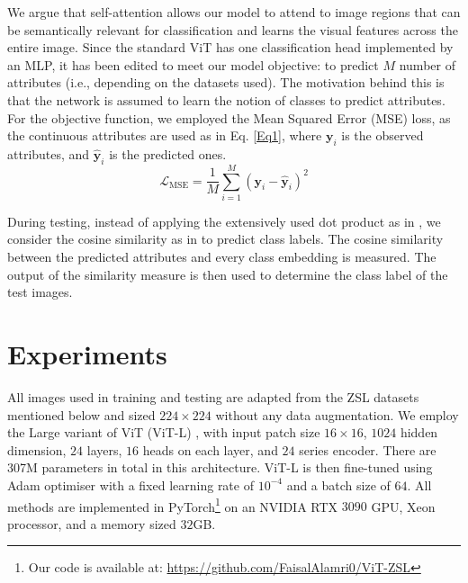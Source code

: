 \documentclass[a4paper,11pt]{article}
\newcommand{\anjan}[1]{\textcolor{red}{Anjan: #1}}
\newcommand{\myparagraph}[1]{\vspace{4pt}\noindent{\bf #1}}
\begin{document}
We argue that self-attention allows our model to attend to image regions that can be semantically relevant for classification and learns the visual features across the entire image. Since the standard ViT has one classification head implemented by an MLP, it has been edited to meet our model objective: to predict $M$ number of attributes (i.e., depending on the datasets used). The motivation behind this is that the network is assumed to learn the notion of classes to predict attributes. For the objective function, we employed the Mean Squared Error (MSE) loss, as the continuous attributes are used as in Eq. \ref{Eq1}, where $\mathbf{y}_i$ is the observed attributes, and $\mathbf{\hat{y}}_i$ is the predicted ones. 
\begin{equation}
\mathcal{L}_\text{MSE} = \displaystyle\frac{1}{M}\sum_{i=1}^{M}(\mathbf{y}_i - \mathbf{\hat{y}}_i)^2 
\label{Eq1}
\end{equation}

During testing, instead of applying the extensively used dot product as in \cite{APN}, we consider the cosine similarity as in \cite{Gidaris2018DynamicFV} to predict class labels. The cosine similarity between the predicted attributes and every class embedding is measured. The output of the similarity measure is then used to determine the class label of the test images.

\section{Experiments} \label{Experiment}

\myparagraph{Implementation Details:} 
All images used in training and testing are adapted from the ZSL datasets mentioned below and sized $224 \times 224$ without any data augmentation. We employ the Large variant of ViT (ViT-L) \cite{ViT}, with input patch size $16 \times 16$, $1024$ hidden dimension, $24$ layers, $16$ heads on each layer, and $24$ series encoder. There are 307M parameters in total in this architecture. ViT-L is then fine-tuned using Adam optimiser with a fixed learning rate of $10^{-4}$ and a batch size of $64$. All methods are implemented in PyTorch\footnote{Our code is available at: \url{https://github.com/FaisalAlamri0/ViT-ZSL}} on an NVIDIA RTX $3090$ GPU, Xeon processor, and a memory sized $32$GB.

\end{document}
